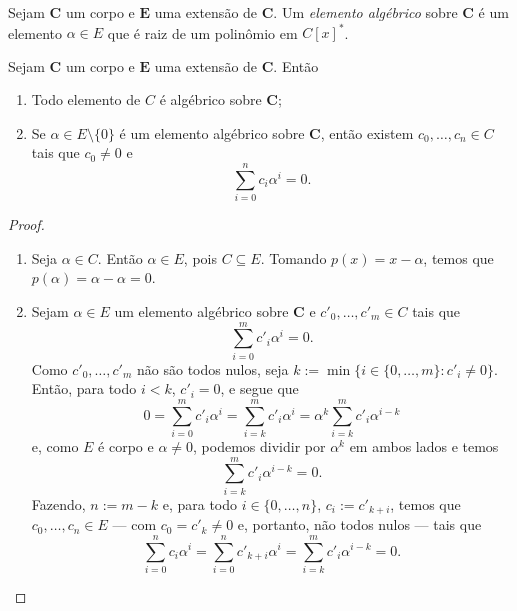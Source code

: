 \begin{defi}
	Sejam $\bm C$ um corpo e $\bm E$ uma extensão de $\bm C$. Um \emph{elemento algébrico} sobre $\bm C$ é um elemento $\alpha \in E$ que é raiz de um polinômio em $C[x]^*$.
\end{defi}

\begin{prop}
	Sejam $\bm C$ um corpo e $\bm E$ uma extensão de $\bm C$. Então
	\begin{enumerate}
	\item Todo elemento de $C$ é algébrico sobre $\bm C$;
	\item Se $\alpha \in E \setminus \{0\}$ é um elemento algébrico sobre $\bm C$, então existem $c_0,\ldots,c_n \in C$ tais que $c_0 \neq 0$ e
	\begin{equation*}
	\sum_{i=0}^n c_i\alpha^i = 0.
	\end{equation*}
	\end{enumerate}
\end{prop}
\begin{proof}
	\begin{enumerate}
	\item Seja $\alpha \in C$. Então $\alpha \in E$, pois $C \subseteq E$. Tomando $p(x)=x-\alpha$, temos que $p(\alpha)=\alpha-\alpha=0$.
	\item Sejam $\alpha \in E$ um elemento algébrico sobre $\bm C$ e $c'_0,\ldots,c'_m \in C$ tais que
	\begin{equation*}
	\sum_{i=0}^m c'_i\alpha^i = 0.
	\end{equation*}
Como $c'_0, \ldots,c'_m$ não são todos nulos, seja $k := \min\{i \in \{0,\ldots,m\} : c'_i \neq 0\}$. Então, para todo $i < k$, $c'_i = 0$, e segue que
	\begin{equation*}
	0 = \sum_{i=0}^m c'_i\alpha^i = \sum_{i=k}^m c'_i\alpha^i = \alpha^k \sum_{i=k}^m c'_i\alpha^{i-k}
	\end{equation*}
e, como $E$ é corpo e $\alpha \neq 0$, podemos dividir por $\alpha^k$ em ambos lados e temos
	\begin{equation*}
	\sum_{i=k}^m c'_i\alpha^{i-k} = 0.
	\end{equation*}
Fazendo, $n := m-k$ e, para todo $i \in \{0,\ldots,n\}$, $c_i := c'_{k+i}$, temos que $c_0,\ldots,c_n \in E$ — com $c_0 = c'_k \neq 0$ e, portanto, não todos nulos — tais que
	\begin{equation*}
	\sum_{i=0}^n c_i\alpha^i = \sum_{i=0}^n c'_{k+i}\alpha^i = \sum_{i=k}^m c'_i\alpha^{i-k} = 0.
	\end{equation*}
	\end{enumerate}
\end{proof}

